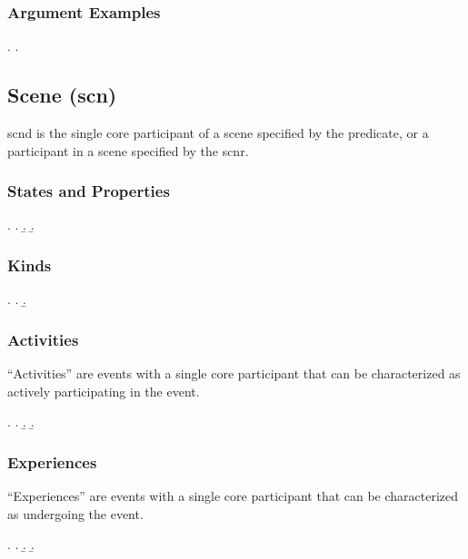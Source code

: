 \documentclass[a4paper]{article}
\begin{document}
\subsubsection{Argument Examples}

\ex.
\a. 

\clearpage
\subsection{Scene (\textsf{scn})}
\label{sec:scn}

\textsf{scnd} is the single core participant of a scene specified by the
predicate, or a participant in a scene specified by the \textsf{scnr}.

\subsubsection{States and Properties}

\ex. \a. 
     \b. 
     \b. 

\subsubsection{Kinds}

\ex. \a. 
     \b. 

\subsubsection{Activities}

``Activities'' are events with a single core participant that can be
characterized as actively participating in the event.

\ex. \a. 
     \b. 
     \b. 

\subsubsection{Experiences}

``Experiences'' are events with a single core participant that can be
characterized as undergoing the event.

\ex. \a. 
     \b. 
     \b. 
\end{document}
